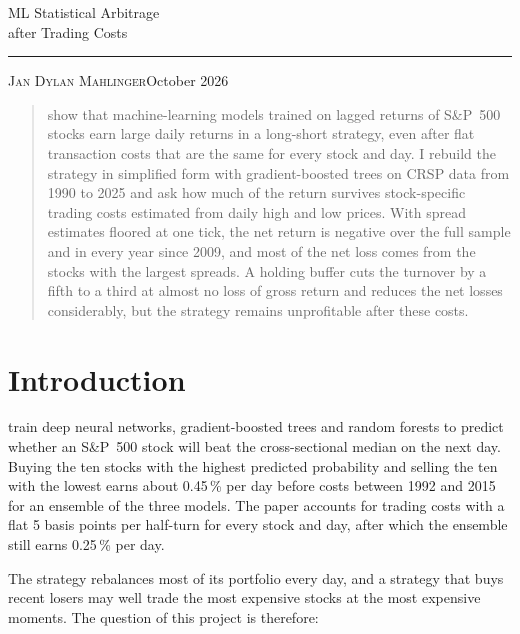 \documentclass[11pt,a4paper]{article}
\theoremstyle{definition}
\theoremstyle{remark}
\begin{document}
\thispagestyle{empty}
\begin{flushleft}
  {\LARGE ML Statistical Arbitrage\\[0.3ex] after Trading Costs\par}
  \vspace{1.5ex}
  \rule{\textwidth}{0.4pt}\par
  \vspace{1ex}
  {\scshape Jan Dylan Mahlinger}\hfill October 2026\par
\end{flushleft}

\vspace{3ex}
\begin{quote}
\small
\citet{krauss2017deep} show that machine-learning models trained on lagged
returns of S\&P~500 stocks earn large daily returns in a long-short strategy,
even after flat transaction costs that are the same for every stock and day.
I rebuild the strategy in simplified form with
gradient-boosted trees on CRSP data from 1990 to 2025 and ask how much of the
return survives stock-specific trading costs estimated from daily high and low
prices. With spread estimates floored at one tick, the net return is negative
over the full sample and in every year since 2009, and most of the net loss
comes from the stocks with the largest spreads. A holding buffer cuts the turnover by a
fifth to a third at almost no loss of gross return and reduces the net losses
considerably, but the strategy remains unprofitable after these costs.
\end{quote}
\vspace{2ex}


\section{Introduction}

\citet{krauss2017deep} train deep neural networks, gradient-boosted trees
and random forests to predict whether an S\&P~500 stock will beat the
cross-sectional median on the next day. Buying the ten stocks with the highest
predicted probability and selling the ten with the lowest earns about
0.45\,\% per day before costs between 1992 and 2015 for an ensemble of the
three models. The paper accounts for trading costs with a flat 5 basis points
per half-turn for every stock and day, after which the ensemble still earns
0.25\,\% per day.

The strategy rebalances most of its portfolio every day, and a strategy that
buys recent losers may well trade the most expensive stocks at the most
expensive moments. The question of this project is therefore:
\end{document}
